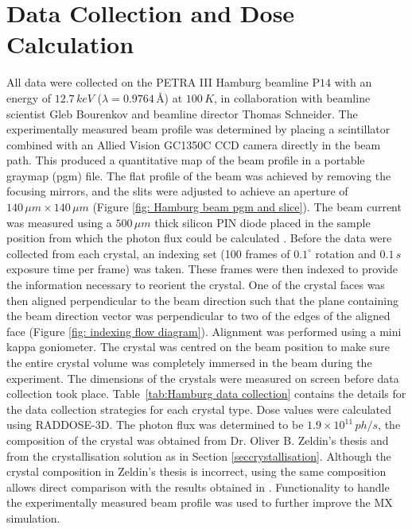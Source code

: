 \section{Data Collection and Dose Calculation}
All data were collected on the PETRA III Hamburg beamline P$14$ with an energy of $12.7\,keV$ ($\lambda = 0.9764\,$\AA) at $100\,K$, in collaboration with beamline scientist Gleb Bourenkov and beamline director Thomas Schneider.
The experimentally measured beam profile was determined by placing a scintillator combined with an Allied Vision GC1350C CCD camera directly in the beam path.
This produced a quantitative map of the beam profile in a portable graymap (pgm) file.
The flat profile of the beam was achieved by removing the focusing mirrors, and the slits were adjusted to achieve an aperture of $140\,\mu m \times 140\,\mu m$ (Figure \ref{fig: Hamburg beam pgm and slice}).
The beam current was measured using a $500\,\mu m$ thick silicon PIN diode placed in the sample position from which the photon flux could be calculated \cite{owen2009}.
Before the data were collected from each crystal, an indexing set (100 frames of $0.1^\circ$ rotation and $0.1\,s$ exposure time per frame) was taken.
These frames were then indexed to provide the information necessary to reorient the crystal.
One of the crystal faces was then aligned perpendicular to the beam direction such that the plane containing the beam direction vector was perpendicular to two of the edges of the aligned face (Figure \ref{fig: indexing flow diagram}).
Alignment was performed using a mini kappa goniometer.
The crystal was centred on the beam position to make sure the entire crystal volume was completely immersed in the beam during the experiment.
The dimensions of the crystals were measured on screen before data collection took place.
Table~\ref{tab:Hamburg data collection} contains the details for the data collection strategies for each crystal type.
Dose values were calculated using RADDOSE-3D.
The photon flux was determined to be $1.9 \times 10^{11}\,ph/s$, the composition of the crystal was obtained from Dr. Oliver B. Zeldin's thesis \cite{zeldin2013thesis} and from the crystallisation solution as in Section \ref{seccrystallisation}.
Although the crystal composition in Zeldin's thesis is incorrect, using the same composition allows direct comparison with the results obtained in \cite{zeldin2013dwd}.
Functionality to handle the experimentally measured beam profile was used to further improve the MX simulation.
